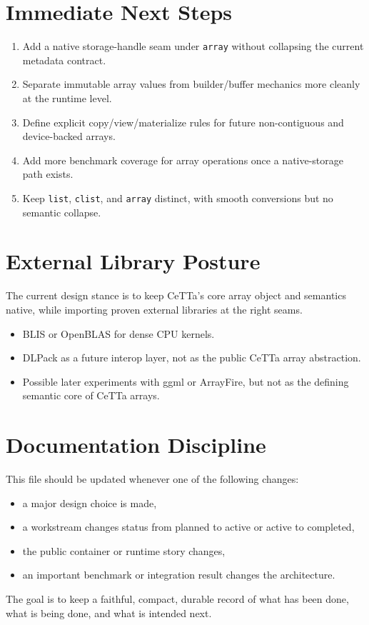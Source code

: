 \documentclass[11pt]{article}
\begin{document}
\section{Immediate Next Steps}
\begin{enumerate}
  \item Add a native storage-handle seam under \texttt{array} without collapsing the current metadata contract.
  \item Separate immutable array values from builder/buffer mechanics more cleanly at the runtime level.
  \item Define explicit copy/view/materialize rules for future non-contiguous and device-backed arrays.
  \item Add more benchmark coverage for array operations once a native-storage path exists.
  \item Keep \texttt{list}, \texttt{clist}, and \texttt{array} distinct, with smooth conversions but no semantic collapse.
\end{enumerate}

\section{External Library Posture}
The current design stance is to keep CeTTa's core array object and semantics native, while importing proven external libraries at the right seams.
\begin{itemize}
  \item BLIS or OpenBLAS for dense CPU kernels.
  \item DLPack as a future interop layer, not as the public CeTTa array abstraction.
  \item Possible later experiments with ggml or ArrayFire, but not as the defining semantic core of CeTTa arrays.
\end{itemize}

\section{Documentation Discipline}
This file should be updated whenever one of the following changes:
\begin{itemize}
  \item a major design choice is made,
  \item a workstream changes status from planned to active or active to completed,
  \item the public container or runtime story changes,
  \item an important benchmark or integration result changes the architecture.
\end{itemize}
The goal is to keep a faithful, compact, durable record of what has been done, what is being done, and what is intended next.
\end{document}
